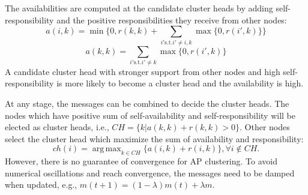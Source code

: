 \documentclass[10pt, conference, letterpaper]{IEEEtran}
\DeclareMathOperator*{\argmax}{arg\,max}
\begin{document}
The availabilities are computed at the candidate cluster heads by adding self-responsibility and the positive responsibilities they receive from other nodes: 
\begin{equation}\label{eq:a_update1}
a(i,k) = \min \Big\{0, r(k,k) + \sum_{i'\text{s.t.}i'\neq i,k}\max \{0, r(i',k) \}\Big\}
\end{equation}
\begin{equation}\label{eq:a_update2}
a(k,k) =\sum_{i'\text{s.t.}i'\neq k}\max \{0, r(i',k) \}
\end{equation}
A candidate cluster head with stronger support from other nodes and high self-responsibility is more likely to become a cluster head and the availability is high. 

At any stage, the messages can be combined to decide the cluster heads. The nodes which have positive sum of self-availability and self-responsibility will be elected as cluster heads, i.e., 
$CH = \{k|a(k,k) + r(k,k)>0\}$. Other nodes select the cluster head which maximize the sum of availability and responsibility:
$$ch(i) = \argmax_{k\in CH}\{a(i,k)+r(i,k)\}, \forall i\notin CH.$$
However, there is no guarantee of convergence for AP clustering. To avoid numerical oscillations and reach convergence, the messages need to be damped when updated, e.g., $m(t+1) = (1-\lambda)m(t) + \lambda m$. 
\end{document}
